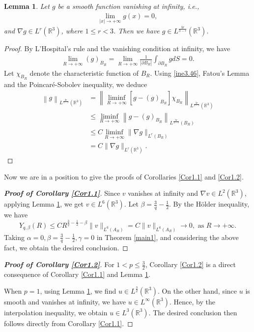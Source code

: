 \documentclass[11pt,reqno]{amsart}
\newtheorem{Lem}{Lemma}[section]
\numberwithin{Thm}{section}
\begin{document}
\begin{Lem}\label{Lem3.8}
Let $g$ be a smooth function vanishing at infinity, i.e.,
\begin{align*}
\lim_{|x|\rightarrow+\infty}g(x)=0,
\end{align*}
and $\nabla g\in L^r(\mathbb{R}^3)$, where $1\leq r<3$. Then we have $g\in L^\frac{3r}{3-r}(\mathbb{R}^3)$.
\end{Lem}
\begin{proof}
By L'Hospital's rule and the vanishing condition at infinity, we have
\begin{align}\label{ine3.46}
\lim_{R\rightarrow+\infty}(g)_{B_R}=\lim_{R\rightarrow+\infty}\frac{1}{|\partial B_R|}\int_{\partial B_R}gdS=0.
\end{align}
Let $\chi_{B_R}$ denote the characteristic function of $B_R$. Using \eqref{ine3.46}, Fatou's Lemma and the Poincar\'{e}-Sobolev inequality, we deduce
\begin{align*}
\left\|g\right\|_{L^{\frac{3r}{3-r}}(\mathbb{R}^3)}&=\left\|\liminf_{R\rightarrow+\infty}[g-(g)_{B_R}]\chi_{B_R}\right\|_{L^{\frac{3r}{3-r}}(\mathbb{R}^3)}\\
&\leq\liminf_{R\rightarrow+\infty}\left\|g-(g)_{B_R}\right\|_{L^{\frac{3r}{3-r}}(B_R)}\\
&\leq C\liminf_{R\rightarrow+\infty}\|\nabla g\|_{L^r(B_R)}\\
&=C\|\nabla g\|_{L^r(\mathbb{R}^3)}.
\end{align*}
\end{proof}

Now we are in a position to give the proofs of Corollaries \ref {Cor1.1} and \ref {Cor1.2}.

\begin{proof}[{\bf Proof of Corollary \ref{Cor1.1}}]
Since $v$ vanishes at infinity and $\nabla v\in L^2(\mathbb{R}^3)$, applying Lemma \ref{Lem3.8}, we get $v\in L^6(\mathbb{R}^3)$.
Let $\beta=\frac{3}{q}-\frac{1}{2}$.
By the H\"{o}lder inequality, we have
$$Y_{q,\beta}(R)\leq CR^{\frac{3}{q}-\frac{1}{2}-\beta}\|v\|_{L^6(A_R)}=C\|v\|_{L^6(A_R)}\rightarrow0, \text{ as }R\rightarrow+\infty.$$
Taking $\alpha=0,\beta=\frac{3}{q}-\frac{1}{2}, \gamma=0$ in Theorem \ref{main1}, and considering the above fact, we obtain the desired conclusion.
\end{proof}

\begin{proof}[{\bf Proof of Corollary \ref{Cor1.2}}] For $1<p\leq\frac{3}{2}$, Corollary \ref{Cor1.2} is a direct consequence of Corollary \ref{Cor1.1} and Lemma \ref{Lem3.8}.


When $p=1$, using Lemma \ref{Lem3.8}, we find $u\in L^\frac{3}{2}(\mathbb{R}^3)$. On the other hand, since $u$ is smooth and vanishes at infinity, we have $u\in L^\infty(\mathbb{R}^3)$.
Hence, by the interpolation inequality, we obtain $u\in L^3(\mathbb{R}^3)$. The desired conclusion then follows directly from Corollary \ref{Cor1.1}.

\end{proof}
\end{document}
